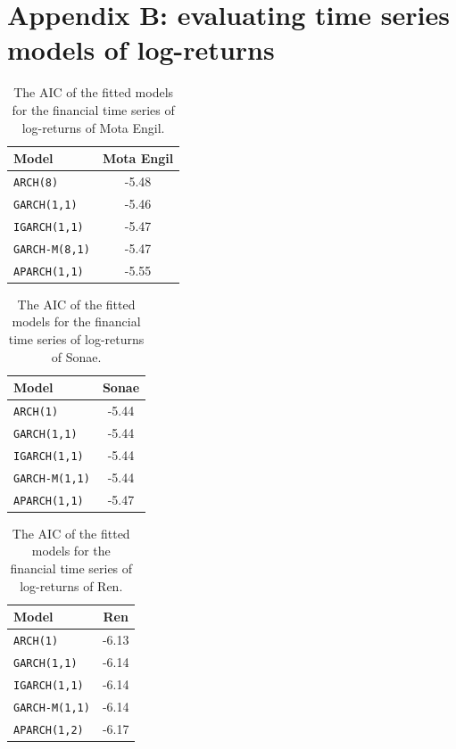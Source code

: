 \documentclass{article}
\begin{document}
\newpage
\section{Appendix B: evaluating time series models of log-returns}
\label{ap:b}
\begin{table}[ht!]
    \centering
    \begin{tabular}{|l|c|}
        \hline
    \textbf{Model} 
      & \textbf{Mota Engil} 
     \\ \hline
      \verb|ARCH(8)|& -5.48  \\ \hline 
      \verb|GARCH(1,1)|  & -5.46  \\ \hline
      \verb|IGARCH(1,1)|  &  -5.47 \\ \hline
      \verb|GARCH-M(8,1)|  & -5.47  \\ \hline
      \verb|APARCH(1,1)|  & -5.55  \\  \hline
    \end{tabular}
    \caption{The AIC of the fitted models for the financial time series of log-returns
    of Mota Engil.}
    \label{model:monta_engil}
  \end{table}


  \begin{table}[ht!]
    \centering
    \begin{tabular}{|l|c|}
\hline
\textbf{Model} 
      & \textbf{Sonae} 
     \\ \hline
      \midrule
      \verb|ARCH(1)|&  -5.44 \\ \hline 
      \verb|GARCH(1,1)|  &  -5.44 \\ \hline
      \verb|IGARCH(1,1)|  & -5.44  \\ \hline
      \verb|GARCH-M(1,1)|  &  -5.44 \\ \hline
      \verb|APARCH(1,1)|  & -5.47  \\  \hline
    \end{tabular}
    \caption{The AIC of the fitted models for the financial time series of log-returns
    of Sonae.}
    \label{model:Sonae}
  \end{table}


  

  \begin{table}[ht!]
    \centering
    \begin{tabular}{|l|c|}
\hline
      \textbf{Model} 
      & \textbf{Ren} 
     \\ \hline
      \verb|ARCH(1)|&  -6.13 \\ \hline 
      \verb|GARCH(1,1)|  & -6.14  \\ \hline
      \verb|IGARCH(1,1)|  &  -6.14 \\ \hline
      \verb|GARCH-M(1,1)|  &  -6.14 \\ \hline
      \verb|APARCH(1,2)|  &  -6.17 \\  \hline
    \end{tabular}
    \caption{The AIC of the fitted models for the financial time series of log-returns
    of Ren.}
    \label{model:Ren}
  \end{table}
\end{document}
